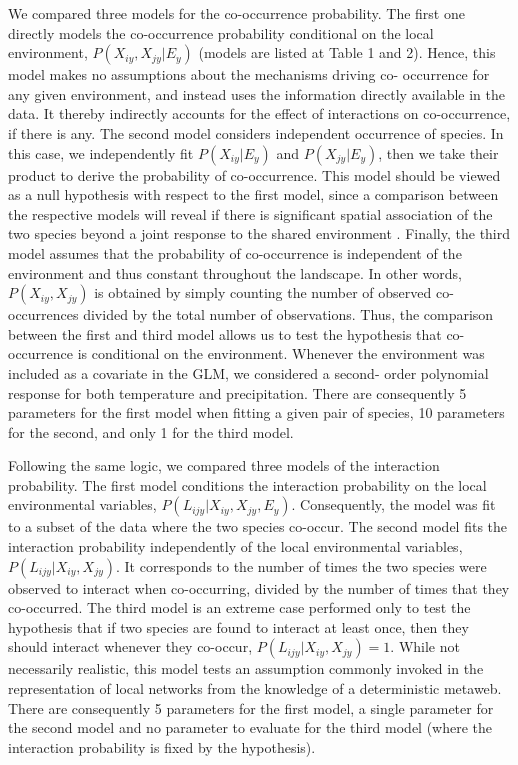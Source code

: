 \documentclass[12pt]{article}
\begin{document}
We compared three models for the co-occurrence probability. The first one
directly models the co-occurrence probability conditional on the local
environment, $P(X_{iy},X_{jy}|E_y)$ (models are listed at Table 1 and 2).
Hence, this model makes no assumptions about the mechanisms driving co-
occurrence for any given environment, and instead uses the information directly
available in the data. It thereby indirectly accounts for the effect of
interactions on co-occurrence, if there is any. The second model considers
independent occurrence of species. In this case, we independently fit
$P(X_{iy} |E_y)$ and $P(X_{jy} |E_y)$, then we take their product to derive
the probability of co-occurrence. This model should be viewed as a null
hypothesis with respect to the first model, since a comparison between the
respective models will reveal if there is significant spatial association of
the two species beyond a joint response to the shared environment
\citep{Cazelles2015}. Finally, the third model assumes that the probability of
co-occurrence is independent of the environment and thus constant throughout
the landscape. In other words, $P(X_{iy},X_{jy})$ is obtained by simply counting the
number of observed co-occurrences divided by the total number of observations.
Thus, the comparison between the first and third model allows us to test the
hypothesis that co-occurrence is conditional on the environment. Whenever the
environment was included as a covariate in the GLM, we considered a second-
order polynomial response for both temperature and precipitation. There are
consequently 5 parameters for the first model when fitting a given pair of
species, 10 parameters for the second, and only 1 for the third model.

Following the same logic, we compared three models of the interaction
probability. The first model conditions the interaction probability on the
local environmental variables, $P(L_{ijy}|X_{iy},X_{jy},E_y)$. Consequently,
the model was fit to a subset of the data where the two species co-occur.
The second model fits the interaction probability independently of the local
environmental variables, $P(L_{ijy}|X_{iy},X_{jy})$. It corresponds to the
number of times the two species were observed to interact when co-occurring,
divided by the number of times that they co-occurred. The third model is an
extreme case performed only to test the hypothesis that if two species are
found to interact at least once, then they should interact whenever they co-occur,
$P(L_{ijy}|X_{iy},X_{jy})=1$. While not necessarily realistic, this
model tests an assumption commonly invoked in the representation of local
networks from the knowledge of a deterministic metaweb. There are consequently
5 parameters for the first model, a single parameter for the second model and
no parameter to evaluate for the third model (where the interaction
probability is fixed by the hypothesis).
\end{document}

